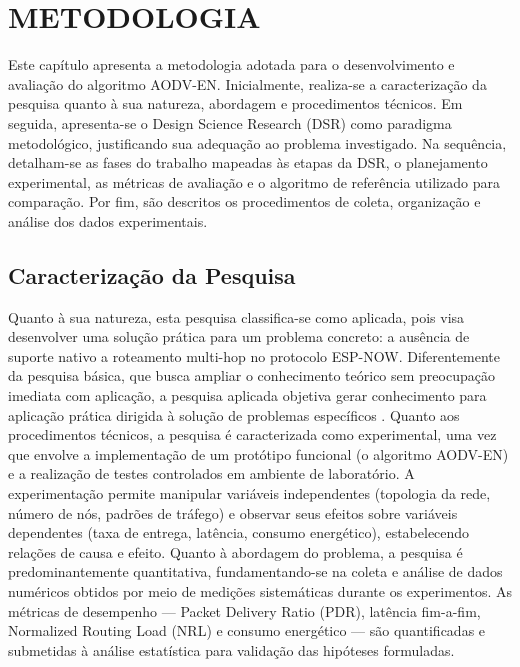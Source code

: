 \chapter{METODOLOGIA}\label{cap:metodologia}\label{metodologia}

Este capítulo apresenta a metodologia adotada para o desenvolvimento e
avaliação do algoritmo AODV-EN. Inicialmente, realiza-se a
caracterização da pesquisa quanto à sua natureza, abordagem e
procedimentos técnicos. Em seguida, apresenta-se o Design Science
Research (DSR) como paradigma metodológico, justificando sua adequação
ao problema investigado. Na sequência, detalham-se as fases do trabalho
mapeadas às etapas da DSR, o planejamento experimental, as métricas de
avaliação e o algoritmo de referência utilizado para comparação. Por
fim, são descritos os procedimentos de coleta, organização e análise dos
dados experimentais.

\section{Caracterização da
Pesquisa}\label{caracterizauxe7uxe3o-da-pesquisa}

Quanto à sua natureza, esta pesquisa classifica-se como aplicada, pois
visa desenvolver uma solução prática para um problema concreto: a
ausência de suporte nativo a roteamento multi-hop no protocolo ESP-NOW.
Diferentemente da pesquisa básica, que busca ampliar o conhecimento
teórico sem preocupação imediata com aplicação, a pesquisa aplicada
objetiva gerar conhecimento para aplicação prática dirigida à solução de
problemas específicos \cite{gil2017}. Quanto aos procedimentos técnicos, a
pesquisa é caracterizada como experimental, uma vez que envolve a
implementação de um protótipo funcional (o algoritmo AODV-EN) e a
realização de testes controlados em ambiente de laboratório. A
experimentação permite manipular variáveis independentes (topologia da
rede, número de nós, padrões de tráfego) e observar seus efeitos sobre
variáveis dependentes (taxa de entrega, latência, consumo energético),
estabelecendo relações de causa e efeito. Quanto à abordagem do
problema, a pesquisa é predominantemente quantitativa, fundamentando-se
na coleta e análise de dados numéricos obtidos por meio de medições
sistemáticas durante os experimentos. As métricas de desempenho ---
Packet Delivery Ratio (PDR), latência fim-a-fim, Normalized Routing Load
(NRL) e consumo energético --- são quantificadas e submetidas à análise
estatística para validação das hipóteses formuladas.

